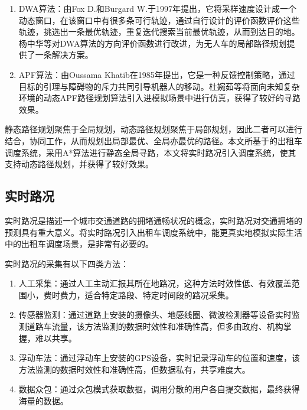 \begin{enumerate}
    \item DWA算法：由Fox D.和Burgard W.于1997年提出\cite{1997The}，它将采样速度设计成一个动态窗口，在该窗口中有很多条可行轨迹，通过自行设计的评价函数评价这些轨迹，挑选出一条最优轨迹，重复迭代搜索当前最优轨迹，从而到达目的地。杨中华等\cite{杨中华0基于改进方向评价函数}对DWA算法的方向评价函数进行改进，为无人车的局部路径规划提供了一条解决方案。
    \item APF算法：由Oussama Khatib在1985年提出\cite{1986Real}，它是一种反馈控制策略，通过目标的引理与障碍物的斥力共同引导机器人的移动。杜婉茹\cite{杜婉茹2021面向未知环境及动态障碍的人工势场路径规划算法}等将面向未知复杂环境的动态APF路径规划算法引入进模拟场景中进行仿真，获得了较好的寻路效果。
\end{enumerate}

\space 静态路径规划聚焦于全局规划，动态路径规划聚焦于局部规划，因此二者可以进行结合，协同工作，从而规划出局部最优、全局亦最优的路径。本文所基于的出租车调度系统，采用A*算法进行静态全局寻路，本文将实时路况引入调度系统，使其支持动态路径规划，并获得了较好效果。

\subsection{实时路况}

实时路况是描述一个城市交通道路的拥堵通畅状况的概念，实时路况对交通拥堵的预测具有重大意义\cite{何小波2021基于互联网地图的矢量路况数据生成与应用方法研究}。将实时路况引入出租车调度系统中，能更真实地模拟实际生活中的出租车调度场景，是非常有必要的。

实时路况的采集有以下四类方法\cite{何小波2021基于互联网地图的矢量路况数据生成与应用方法研究}：

\begin{enumerate}
    \item 人工采集：通过人工主动汇报其所在地路况，这种方法时效性低、有效覆盖范围小，费时费力，适合特定路段、特定时间段的路况采集。
    \item 传感器监测：通过道路上安装的摄像头、地感线圈、微波检测器等设备实时监测道路车流量，该方法监测的数据时效性和准确性高，但多由政府、机构掌握，难以共享。
    \item 浮动车法：通过浮动车上安装的GPS设备，实时记录浮动车的位置和速度，该方法监测的数据时效性和准确性高，但数据私有，共享难度大。
    \item 数据众包：通过众包模式获取数据，调用分散的用户各自提交数据，最终获得海量的数据。
\end{enumerate}

